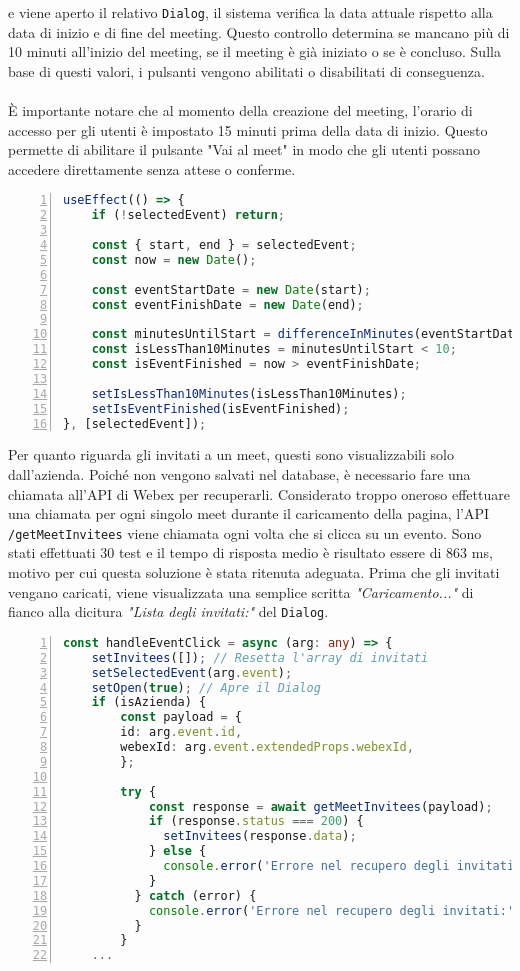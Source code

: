 e viene aperto il relativo \texttt{Dialog}, il sistema verifica la data attuale 
rispetto alla data di inizio e di fine del meeting. Questo controllo determina se mancano più di 10 
minuti all'inizio del meeting, se il meeting è già iniziato o se è concluso. Sulla base di questi valori, 
i pulsanti vengono abilitati o disabilitati di conseguenza.
\\ 
\\
È importante notare che al momento della creazione del meeting, 
l'orario di accesso per gli utenti è impostato 15 minuti prima della data di inizio. 
Questo permette di abilitare il pulsante "Vai al meet" in modo che gli utenti possano accedere 
direttamente senza attese o conferme.
\begin{lstlisting}[language=typescript, frame=lines, basicstyle=\ttfamily\scriptsize, numbers=left]
useEffect(() => {
    if (!selectedEvent) return;
      
    const { start, end } = selectedEvent;
    const now = new Date();
      
    const eventStartDate = new Date(start);
    const eventFinishDate = new Date(end);
      
    const minutesUntilStart = differenceInMinutes(eventStartDate, now);
    const isLessThan10Minutes = minutesUntilStart < 10;
    const isEventFinished = now > eventFinishDate;
      
    setIsLessThan10Minutes(isLessThan10Minutes);
    setIsEventFinished(isEventFinished);
}, [selectedEvent]);
\end{lstlisting}
\vspace{0.3cm}
Per quanto riguarda gli invitati a un meet, questi sono visualizzabili solo dall'azienda. 
Poiché non vengono salvati nel database, è necessario fare una chiamata all'API di Webex per recuperarli.
Considerato troppo oneroso effettuare una chiamata per ogni singolo meet durante il caricamento della 
pagina, l'API \texttt{/getMeetInvitees} viene chiamata ogni 
volta che si clicca su un evento. Sono stati effettuati 30 test e il tempo di risposta medio è 
risultato essere di 863 ms, motivo per cui questa soluzione è stata ritenuta adeguata. 
Prima che gli invitati vengano caricati, viene visualizzata 
una semplice scritta \textit{"Caricamento..."} di fianco alla dicitura \textit{"Lista degli invitati:"}
del \texttt{Dialog}.


\begin{lstlisting}[language=typescript, frame=lines, basicstyle=\ttfamily\scriptsize, numbers=left]
const handleEventClick = async (arg: any) => {
    setInvitees([]); // Resetta l'array di invitati
    setSelectedEvent(arg.event);
    setOpen(true); // Apre il Dialog 
    if (isAzienda) {
        const payload = {
        id: arg.event.id,
        webexId: arg.event.extendedProps.webexId,
        };
    
        try {
            const response = await getMeetInvitees(payload);
            if (response.status === 200) {
              setInvitees(response.data);
            } else {
              console.error('Errore nel recupero degli invitati:', response.statusText);
            }
          } catch (error) {
            console.error('Errore nel recupero degli invitati:', error);
          }
        }
    ...
\end{lstlisting}